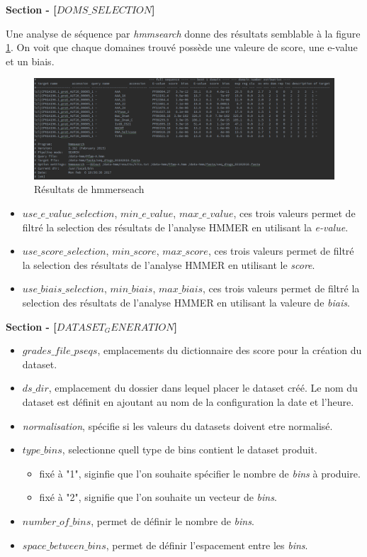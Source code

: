 \textbf{Section - [$DOMS\_SELECTION$]}

Une analyse de séquence par \emph{hmmsearch} donne des résultats semblable à la figure \ref{fig:hmmseach}. On voit que chaque domaines trouvé possède une valeure de score, une e-value et un biais.

\begin{figure}[H] 
\centering 
\includegraphics[width=1\columnwidth]{img/hmmsearchresult} 
\caption[hmmseach]{Résultats de hmmerseach}
\label{fig:hmmseach} 
\end{figure}

\begin{itemize}
\item \emph{$use\_e\_value\_selection$}, \emph{$min\_e\_value$}, \emph{$max\_e\_value$}, ces trois valeurs permet de filtré la selection des résultats de l'analyse HMMER en utilisant la \emph{e-value}.
\item \emph{$use\_score\_selection$}, \emph{$min\_score$}, \emph{$max\_score$}, ces trois valeurs permet de filtré la selection des résultats de l'analyse HMMER en utilisant le \emph{score}.
\item \emph{$use\_biais\_selection$}, \emph{$min\_biais$}, \emph{$max\_biais$}, ces trois valeurs permet de filtré la selection des résultats de l'analyse HMMER en utilisant la valeure de  \emph{biais}.
\end{itemize}

\textbf{Section - [$DATASET_GENERATION$]}

\begin{itemize}
\item \emph{$grades\_file\_pseqs$}, emplacements du dictionnaire des score pour la création du dataset.
\item \emph{$ds\_dir$}, emplacement du dossier dans lequel placer le dataset créé. Le nom du dataset est définit en ajoutant au nom de la configuration la date et l'heure.
\item \emph{normalisation}, spécifie si les valeurs du datasets doivent etre normalisé.
\item \emph{$type\_bins$}, selectionne quell type de bins contient le dataset produit.
\begin{itemize}
\item fixé à "1", siginfie que l'on souhaite spécifier le nombre de \emph{bins} à produire.
\item fixé à "2", signifie que l'on souhaite un vecteur de \emph{bins}.
\end{itemize}
\item \emph{$number\_of\_bins$}, permet de définir le nombre de \emph{bins}.
\item \emph{$space\_between\_bins$}, permet de définir l'espacement entre les \emph{bins}.
\end{itemize}

